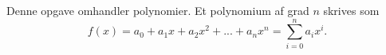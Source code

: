 Denne opgave omhandler polynomier. Et polynomium af grad $n$ skrives som
$$f(x) = a_0+a_1x+a_2x^2+...+a_nx^n = \sum_{i=0}^na_ix^i.$$
